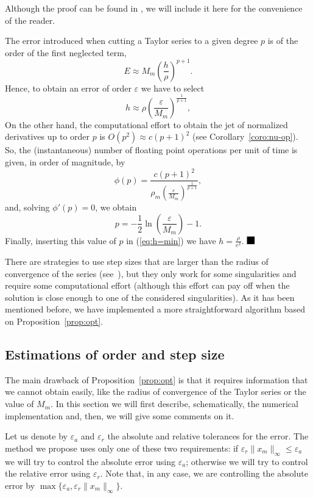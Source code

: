 \documentclass[12pt,twoside]{article}
\newcommand{\bproof}{\noindent {\bf Proof:} }
\newcommand{\eproof}{\hfill $\rule{3mm}{3mm}$}
\begin{document}
\bproof Although the proof can be found in \cite{Simo01a}, we will include
it here for the convenience of the reader.

The error introduced when cutting a Taylor series to a given degree
$p$ is of the order of the first neglected term,
\[
E\approx M_m\left(\frac{h}{\rho}\right)^{p+1}.
\]
Hence, to obtain an error of order $\varepsilon$ we have to select
\begin{equation}
h\approx\rho\left(\frac{\varepsilon}{M_m}\right)^{\frac{1}{p+1}},
\label{eq:h=min}
\end{equation}
On the other hand, the computational effort to obtain the jet of
normalized derivatives up to order $p$ is $O(p^2)\approx c(p+1)^2$
(see Corollary~\ref{coro:nu-op}). So, the (instantaneous) number of
floating point operations per unit of time is given, in order of
magnitude, by
\[
\phi(p)=\frac{c(p+1)^2}
          {\rho_m\left(\frac{\varepsilon}{M_m}\right)^{\frac{1}{p+1}}},
\]
and, solving $\phi'(p)=0$, we obtain
\[
p=-\frac{1}{2}\ln\left(\frac{\varepsilon}{M_m}\right)-1.
\]
Finally, inserting this value of $p$ in (\ref{eq:h=min}) we have
$h=\displaystyle\frac{\rho}{e^2}$.
\eproof

There are strategies to use step sizes that are larger than the radius
of convergence of the series (see~\cite{CorlissC82}), but they only
work for some singularities and require some computational effort
(although this effort can pay off when the solution is close enough
to one of the considered singularities). As it has been mentioned
before, we have implemented a more straightforward algorithm based on
Proposition~\ref{prop:opt}.

\subsection{Estimations of order and step size}
The main drawback of Proposition~\ref{prop:opt} is that it requires
information that we cannot obtain easily, like the radius of
convergence of the Taylor series or the value of $M_m$. In this
section we will first describe, schematically, the numerical
implementation and, then, we will give some comments on it.

Let us denote by $\varepsilon_a$ and $\varepsilon_r$ the absolute and
relative tolerances for the error. The method we propose uses only one
of these two requirements: if
$\varepsilon_r\|x_m\|_{\infty}\le\varepsilon_a$ we will try to control
the absolute error using $\varepsilon_a$; otherwise we will try to
control the relative error using $\varepsilon_r$. Note that, in any
case, we are controlling the absolute error by
$\max\{\varepsilon_a,\varepsilon_r\|x_m\|_{\infty}\}$.
\end{document}
